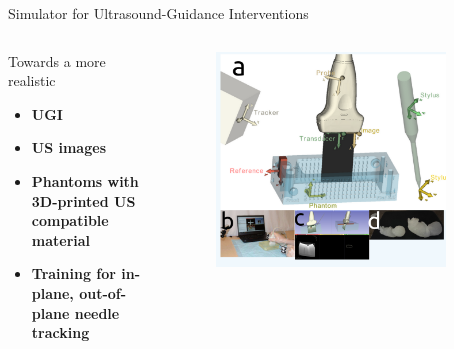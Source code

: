 {
\begin{frame}{Simulator for Ultrasound-Guidance Interventions}

  \begin{columns}
    \begin{column}{.3\linewidth}
      Towards a more realistic
  \begin{itemize}
    \item \textbf{UGI}
    \item \textbf{US images}
    \item \textbf{Phantoms with 3D-printed US compatible material}
    \item \textbf{Training for in-plane, out-of-plane needle tracking}
  \end{itemize}

    \end{column}


  \begin{column}{.6\linewidth}

      \begin{figure}
        \centering
        \includegraphics[width=0.9\textwidth]{./figures/simulator-for-ugi/versions/drawing-v01.png}
      \end{figure}

    \end{column}
  \end{columns}


\end{frame}
}
